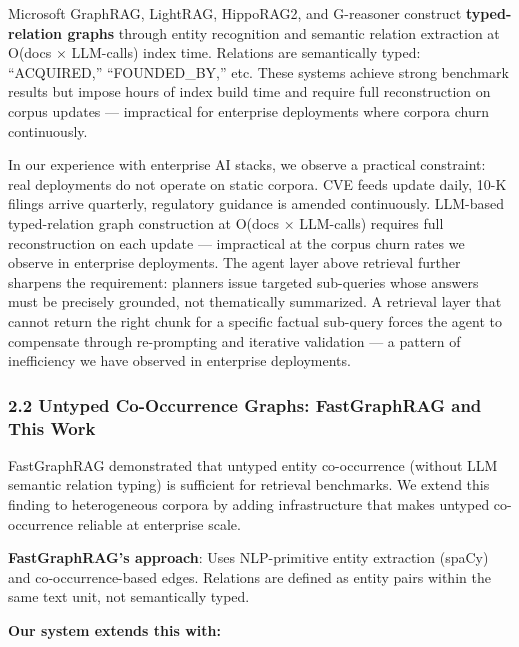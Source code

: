 Microsoft GraphRAG, LightRAG, HippoRAG2, and G-reasoner construct \textbf{typed-relation graphs} through entity recognition and semantic relation extraction at O(docs × LLM-calls) index time. Relations are semantically typed: ``ACQUIRED,'' ``FOUNDED\_BY,'' etc. These systems achieve strong benchmark results but impose hours of index build time and require full reconstruction on corpus updates --- impractical for enterprise deployments where corpora churn continuously.

In our experience with enterprise AI stacks, we observe a practical constraint: real deployments do not operate on static corpora. CVE feeds update daily, 10-K filings arrive quarterly, regulatory guidance is amended continuously. LLM-based typed-relation graph construction at O(docs × LLM-calls) requires full reconstruction on each update --- impractical at the corpus churn rates we observe in enterprise deployments. The agent layer above retrieval further sharpens the requirement: planners issue targeted sub-queries whose answers must be precisely grounded, not thematically summarized. A retrieval layer that cannot return the right chunk for a specific factual sub-query forces the agent to compensate through re-prompting and iterative validation --- a pattern of inefficiency we have observed in enterprise deployments.

\subsubsection{2.2 Untyped Co-Occurrence Graphs: FastGraphRAG and This Work}\label{untyped-co-occurrence-graphs-fastgraphrag-and-this-work}

FastGraphRAG demonstrated that untyped entity co-occurrence (without LLM semantic relation typing) is sufficient for retrieval benchmarks. We extend this finding to heterogeneous corpora by adding infrastructure that makes untyped co-occurrence reliable at enterprise scale.

\textbf{FastGraphRAG's approach}: Uses NLP-primitive entity extraction (spaCy) and co-occurrence-based edges. Relations are defined as entity pairs within the same text unit, not semantically typed.

\textbf{Our system extends this with:}

